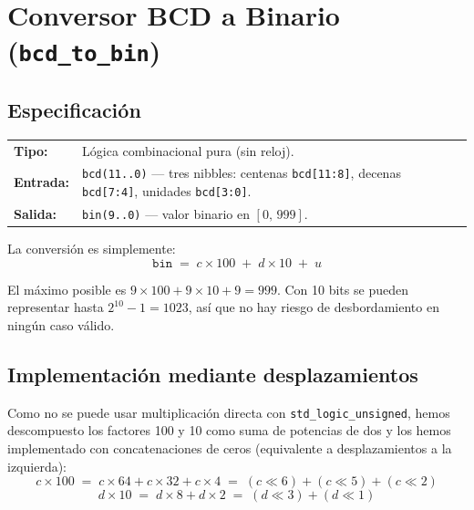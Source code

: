 \documentclass[memoria_final]{subfiles}
\begin{document}
	\section{Conversor BCD a Binario (\texttt{bcd\_to\_bin})}
	
	\subsection{Especificación}
	
	\begin{tcolorbox}[colback=SoftGreen, colframe=MainGreen, boxrule=0.8pt, arc=2pt,
		left=0.5cm, right=0.5cm, top=0.3cm, bottom=0.3cm]
		\small
		\begin{tabular}{ll}
			\textbf{Tipo:}    & Lógica combinacional pura (sin reloj).\\[3pt]
			\textbf{Entrada:} & \texttt{bcd(11..0)} --- tres nibbles:
			centenas \texttt{bcd[11:8]}, decenas \texttt{bcd[7:4]},
			unidades \texttt{bcd[3:0]}.\\[3pt]
			\textbf{Salida:}  & \texttt{bin(9..0)} --- valor binario en
			$\left[0,\,999\right]$.
		\end{tabular}
	\end{tcolorbox}
	
	\vspace{0.4em}
	La conversión es simplemente:
	$$\texttt{bin} \;=\; c \times 100 \;+\; d \times 10 \;+\; u$$
	
	El máximo posible es $9 \times 100 + 9 \times 10 + 9 = 999$. Con 10 bits se pueden representar hasta $2^{10}-1 = 1023$, así que no hay riesgo de desbordamiento en ningún caso válido.
	
	\subsection{Implementación mediante desplazamientos}
	
	Como no se puede usar multiplicación directa con \texttt{std\_logic\_unsigned}, hemos descompuesto los factores 100 y 10 como suma de potencias de dos y los hemos implementado con concatenaciones de ceros (equivalente a desplazamientos a la izquierda):
	$$c \times 100 \;=\; c \times 64 + c \times 32 + c \times 4
	\;=\; (c \!\ll\! 6) + (c \!\ll\! 5) + (c \!\ll\! 2)$$
	$$d \times 10 \;=\; d \times 8 + d \times 2
	\;=\; (d \!\ll\! 3) + (d \!\ll\! 1)$$
	
\end{document}
